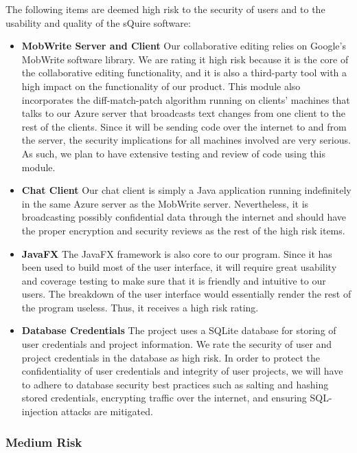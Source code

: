 \documentclass[twoside,letterpaper]{article}
\begin{document}
The following items are deemed high risk to the security of users and to the usability and quality of the sQuire software:

\begin{itemize}
	\item \textbf{MobWrite Server and Client} 
	Our collaborative editing relies on Google's MobWrite software library. We are rating it high risk because it is the core of the collaborative editing functionality, and it is also a third-party tool with a high impact on the functionality of our product. This module also incorporates the diff-match-patch algorithm running on clients' machines that talks to our Azure server that broadcasts text changes from one client to the rest of the clients. Since it will be sending code over the internet to and from the server, the security implications for all machines involved are very serious. As such, we plan to have extensive testing and review of code using this module.
	\item \textbf{Chat Client} 
	Our chat client is simply a Java application running indefinitely in the same Azure server as the MobWrite server. Nevertheless, it is broadcasting possibly confidential data through the internet and should have the proper encryption and security reviews as the rest of the high risk items.
	\item \textbf{JavaFX} 
	The JavaFX framework is also core to our program. Since it has been used to build most of the user interface, it will require great usability and coverage testing to make sure that it is friendly and intuitive to our users. The breakdown of the user interface would essentially render the rest of the program useless. Thus, it receives a high risk rating.
	\item \textbf{Database Credentials}
	The project uses a SQLite database for storing of user credentials and project information. We rate the security of user and project credentials in the database as high risk. In order to protect the confidentiality of user credentials and integrity of user projects, we will have to adhere to database security best practices such as salting and hashing stored credentials, encrypting traffic over the internet, and ensuring SQL-injection attacks are mitigated.
\end{itemize}

\subsubsection{Medium Risk}
\end{document}
